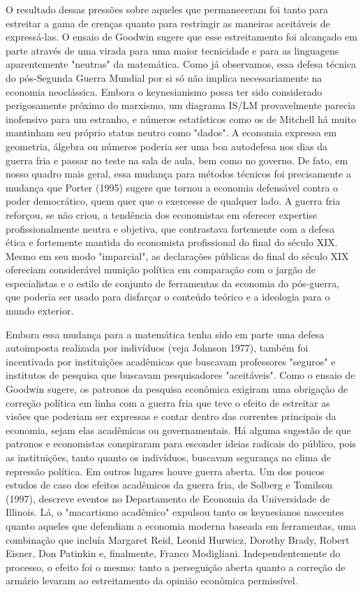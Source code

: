 \documentclass[a4paper,12pt]{article}[abntex2]
\begin{document}
O resultado dessas pressões sobre aqueles que permaneceram foi tanto para estreitar a gama de crenças quanto para restringir as maneiras aceitáveis de expressá-las. O ensaio de Goodwin sugere que esse estreitamento foi alcançado em parte através de uma virada para uma maior tecnicidade e para as linguagens aparentemente "neutras" da matemática. Como já observamos, essa defesa técnica do pós-Segunda Guerra Mundial por si só não implica necessariamente na economia neoclássica. Embora o keynesianismo possa ter sido considerado perigosamente próximo do marxismo, um diagrama IS/LM provavelmente parecia inofensivo para um estranho, e números estatísticos como os de Mitchell há muito mantinham seu próprio status neutro como "dados". A economia expressa em geometria, álgebra ou números poderia ser uma boa autodefesa nos dias da guerra fria e passar no teste na sala de aula, bem como no governo. De fato, em nosso quadro mais geral, essa mudança para métodos técnicos foi precisamente a mudança que Porter (1995) sugere que tornou a economia defensável contra o poder democrático, quem quer que o exercesse de qualquer lado. A guerra fria reforçou, se não criou, a tendência dos economistas em oferecer expertise profissionalmente neutra e objetiva, que contrastava fortemente com a defesa ética e fortemente mantida do economista profissional do final do século XIX. Mesmo em seu modo "imparcial", as declarações públicas do final do século XIX ofereciam considerável munição política em comparação com o jargão de especialistas e o estilo de conjunto de ferramentas da economia do pós-guerra, que poderia ser usado para disfarçar o conteúdo teórico e a ideologia para o mundo exterior.

Embora essa mudança para a matemática tenha sido em parte uma defesa autoimposta realizada por indivíduos (veja Johnson 1977), também foi incentivada por instituições acadêmicas que buscavam professores "seguros" e institutos de pesquisa que buscavam pesquisadores "aceitáveis". Como o ensaio de Goodwin sugere, os patronos da pesquisa econômica exigiram uma obrigação de correção política em linha com a guerra fria que teve o efeito de estreitar as visões que poderiam ser expressas e contar dentro das correntes principais da economia, sejam elas acadêmicas ou governamentais. Há alguma sugestão de que patronos e economistas conspiraram para esconder ideias radicais do público, pois as instituições, tanto quanto os indivíduos, buscavam segurança no clima de repressão política. Em outros lugares houve guerra aberta. Um dos poucos estudos de caso dos efeitos acadêmicos da guerra fria, de Solberg e Tomilson (1997), descreve eventos no Departamento de Economia da Universidade de Illinois. Lá, o "macartismo acadêmico" expulsou tanto os keynesianos nascentes quanto aqueles que defendiam a economia moderna baseada em ferramentas, uma combinação que incluía Margaret Reid, Leonid Hurwicz, Dorothy Brady, Robert Eisner, Don Patinkin e, finalmente, Franco Modigliani. Independentemente do processo, o efeito foi o mesmo: tanto a perseguição aberta quanto a correção de armário levaram ao estreitamento da opinião econômica permissível.
\end{document}
